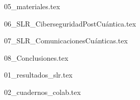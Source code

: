 \documentclass[minitoc, hidelinks, headlogo, framedcover]{tfeEPCC}
\begin{document}
{05_materiales.tex}

{06_SLR_CiberseguridadPostCuántica.tex}

{07_SLR_ComunicacionesCuánticas.tex}

{08_Conclusiones.tex}


\startappendices

{01_resultados_slr.tex}

{02_cuadernos_colab.tex}

\pagebreak
\pagestyle{empty}
\makebibliography
\end{document}
